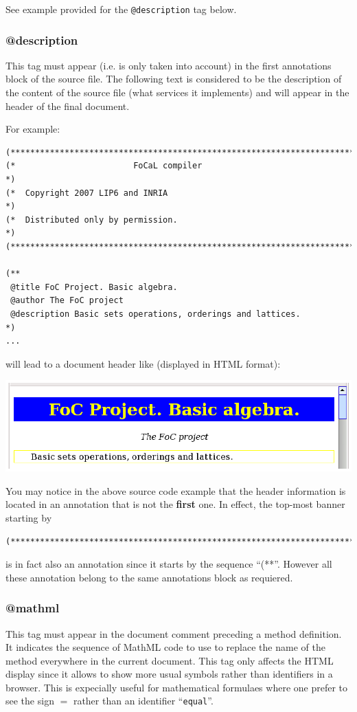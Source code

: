 See example provided for the {\tt @description} tag below.



\subsubsection{@description}
This tag must appear (i.e. is only taken into account) in the first
annotations block of the source file. The following text is considered
to be the description of the content of the source file (what services
it implements) and will appear in the header of the final document.

For example:
{\scriptsize
\begin{lstlisting}
(***********************************************************************)
(*                        FoCaL compiler                               *)
(*  Copyright 2007 LIP6 and INRIA                                      *)
(*  Distributed only by permission.                                    *)
(***********************************************************************)

(**
 @title FoC Project. Basic algebra.
 @author The FoC project
 @description Basic sets operations, orderings and lattices.
*)
...
\end{lstlisting}
}
will lead to a document header like (displayed in HTML format):

\medskip
\includegraphics{header_html_snapshot.ps}

You may notice in the above source code example that the header
information is located in an annotation that is not the {\bf first}
one. In effect, the top-most banner starting by
{\scriptsize
\begin{lstlisting}
(***********************************************************************)
\end{lstlisting}
}
is in fact also an annotation since it starts by the sequence
``(**''. However all these annotation belong to the same annotations
block as requiered.



\subsubsection{@mathml}
This tag must appear in the document comment preceding a method
definition. It indicates the sequence of MathML code to use to replace
the name of the method everywhere in the current document. This tag
only affects the HTML display since it allows to show more usual
symbols rather than identifiers in a browser. This is expecially
useful for mathematical formulaes where one prefer to see the sign $=$
rather than an identifier ``{\tt equal}''.


